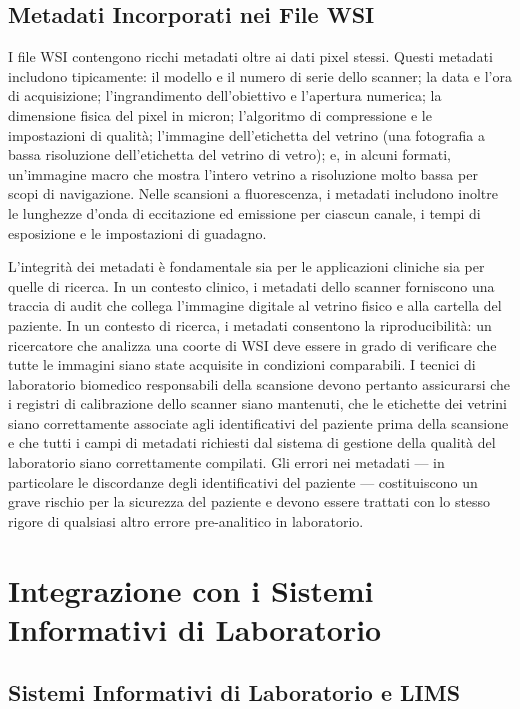 \subsection{Metadati Incorporati nei File WSI}

I file WSI contengono ricchi metadati oltre ai dati pixel stessi. Questi metadati includono tipicamente: il modello e il numero di serie dello scanner; la data e l'ora di acquisizione; l'ingrandimento dell'obiettivo e l'apertura numerica; la dimensione fisica del pixel in micron; l'algoritmo di compressione e le impostazioni di qualità; l'immagine dell'etichetta del vetrino (una fotografia a bassa risoluzione dell'etichetta del vetrino di vetro); e, in alcuni formati, un'immagine macro che mostra l'intero vetrino a risoluzione molto bassa per scopi di navigazione. Nelle scansioni a fluorescenza, i metadati includono inoltre le lunghezze d'onda di eccitazione ed emissione per ciascun canale, i tempi di esposizione e le impostazioni di guadagno.

L'integrità dei metadati è fondamentale sia per le applicazioni cliniche sia per quelle di ricerca. In un contesto clinico, i metadati dello scanner forniscono una traccia di audit che collega l'immagine digitale al vetrino fisico e alla cartella del paziente. In un contesto di ricerca, i metadati consentono la riproducibilità: un ricercatore che analizza una coorte di WSI deve essere in grado di verificare che tutte le immagini siano state acquisite in condizioni comparabili. I tecnici di laboratorio biomedico responsabili della scansione devono pertanto assicurarsi che i registri di calibrazione dello scanner siano mantenuti, che le etichette dei vetrini siano correttamente associate agli identificativi del paziente prima della scansione e che tutti i campi di metadati richiesti dal sistema di gestione della qualità del laboratorio siano correttamente compilati. Gli errori nei metadati --- in particolare le discordanze degli identificativi del paziente --- costituiscono un grave rischio per la sicurezza del paziente e devono essere trattati con lo stesso rigore di qualsiasi altro errore pre-analitico in laboratorio.

\section{Integrazione con i Sistemi Informativi di Laboratorio}

\subsection{Sistemi Informativi di Laboratorio e LIMS}

